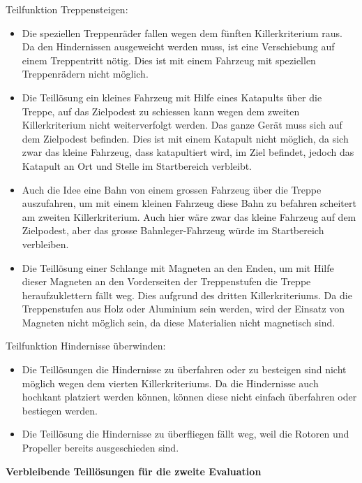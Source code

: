 Teilfunktion Treppensteigen:
\begin{itemize}
    \item Die speziellen Treppenräder fallen wegen dem fünften Killerkriterium raus. Da den Hindernissen ausgeweicht werden muss, ist eine Verschiebung auf einem Treppentritt nötig. Dies ist mit einem Fahrzeug mit speziellen Treppenrädern nicht möglich.
    \item Die Teillösung ein kleines Fahrzeug mit Hilfe eines Katapults über die Treppe, auf das Zielpodest zu schiessen kann wegen dem zweiten Killerkriterium nicht weiterverfolgt werden. Das ganze Gerät muss sich auf dem Zielpodest befinden. Dies ist mit einem Katapult nicht möglich, da sich zwar das kleine Fahrzeug, dass katapultiert wird, im Ziel befindet, jedoch das Katapult an Ort und Stelle im Startbereich verbleibt.
    \item Auch die Idee eine Bahn von einem grossen Fahrzeug über die Treppe auszufahren, um mit einem kleinen Fahrzeug diese Bahn zu befahren scheitert am zweiten Killerkriterium. Auch hier wäre zwar das kleine Fahrzeug auf dem Zielpodest, aber das grosse Bahnleger-Fahrzeug würde im Startbereich verbleiben.
    \item Die Teillösung einer Schlange mit Magneten an den Enden, um mit Hilfe dieser Magneten an den Vorderseiten der Treppenstufen die Treppe heraufzuklettern fällt weg. Dies aufgrund des dritten Killerkriteriums. Da die Treppenstufen aus Holz oder Aluminium sein werden, wird der Einsatz von Magneten nicht möglich sein, da diese Materialien nicht magnetisch sind.
\end{itemize}

Teilfunktion Hindernisse überwinden:
\begin{itemize}
    \item Die Teillösungen die Hindernisse zu überfahren oder zu besteigen sind nicht möglich wegen dem vierten Killerkriteriums. Da die Hindernisse auch hochkant platziert werden können, können diese nicht einfach überfahren oder bestiegen werden.
    \item Die Teillösung die Hindernisse zu überfliegen fällt weg, weil die Rotoren und Propeller bereits ausgeschieden sind.
 \end{itemize}

\textbf{Verbleibende Teillösungen für die zweite Evaluation}

